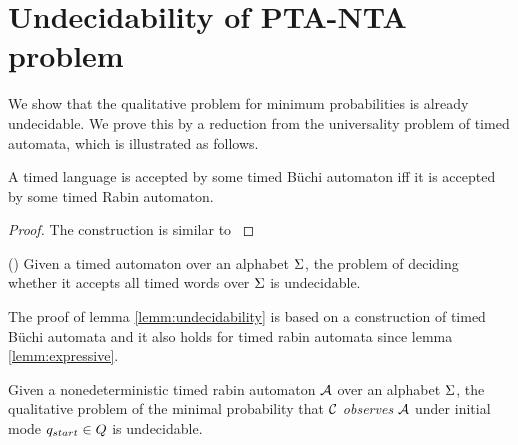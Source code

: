 \section{Undecidability of PTA-NTA problem}
We show that the qualitative problem for minimum probabilities is already undecidable. We prove this by a reduction from the universality problem of timed automata, which is illustrated as follows. 
%
\begin{lemma}\label{lemm:expressive}
A timed language is accepted by some timed B\"uchi automaton iff it is accepted by some timed Rabin automaton.
\end{lemma}
\begin{proof}
    The construction is similar to \cite[Theorem 3.20.]{DBLP:conf/tapsoft/Vaandrager97}
\end{proof}
%
\begin{lemma}{(\cite[Theorem 5.2.]{DBLP:conf/tapsoft/Vaandrager97})}\label{lemm:undecidability}
Given a timed automaton over an alphabet $\Sigma$, the problem of deciding whether it accepts all timed words over $\Sigma$ is undecidable.
\end{lemma}
%
The proof of lemma \ref{lemm:undecidability} is based on a construction of timed B\"uchi automata and it also holds for timed rabin
automata since lemma \ref{lemm:expressive}.
%
\begin{proposition}
Given a nonedeterministic timed rabin automaton $\mathcal{A}$ over an alphabet $\Sigma$, the qualitative problem of 
the minimal probability that $\mathcal{C}$ \emph{observes} $\mathcal{A}$ under initial mode 
$q_{start} \in Q$ is undecidable.
\end{proposition}
%
